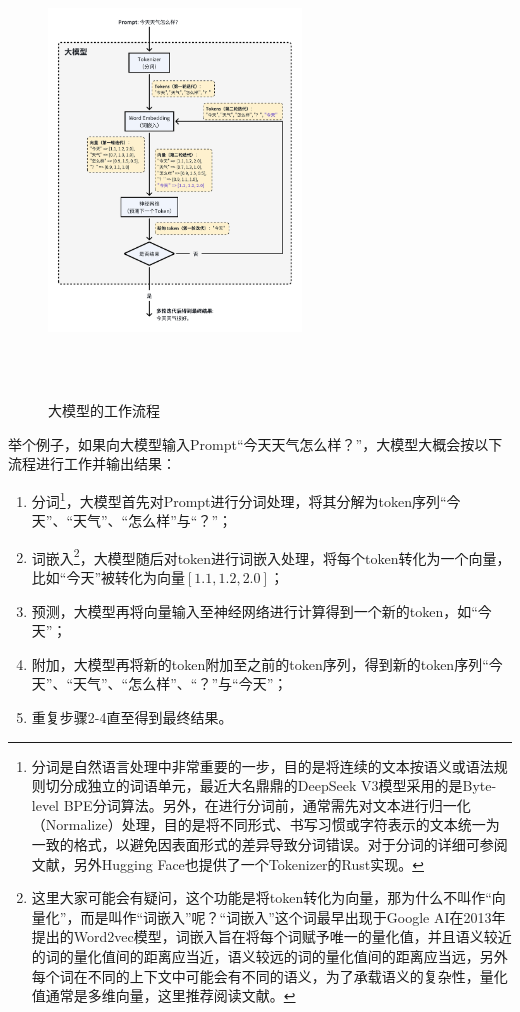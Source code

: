 \documentclass[letterpaper,11pt]{article}
\numberwithin{equation}{section}
\begin{document}
\begin{figure}[!htbp]
    \centering
    \includegraphics[width=0.6\textwidth, height=12cm, keepaspectratio]{../../assets/imgs/ai_share/llm_workflow.pdf}
    \caption{大模型的工作流程}
    \label{fig:llm-workflow}
\end{figure}

举个例子，如果向大模型输入Prompt“今天天气怎么样？”，大模型大概会按以下流程进行工作并输出结果：
\begin{enumerate}
    \item 分词\footnote{分词是自然语言处理中非常重要的一步，目的是将连续的文本按语义或语法规则切分成独立的词语单元，最近大名鼎鼎的DeepSeek V3模型采用的是Byte-level BPE分词算法。另外，在进行分词前，通常需先对文本进行归一化（Normalize）处理，目的是将不同形式、书写习惯或字符表示的文本统一为一致的格式，以避免因表面形式的差异导致分词错误。对于分词的详细可参阅文献\cite{glan2023tokenizer}，另外Hugging Face也提供了一个Tokenizer的Rust实现\cite{huggingface_tokenizers}。}，大模型首先对Prompt进行分词处理，将其分解为token序列“今天”、“天气”、“怎么样”与“？”；
    \item 词嵌入\footnote{这里大家可能会有疑问，这个功能是将token转化为向量，那为什么不叫作“向量化”，而是叫作“词嵌入”呢？“词嵌入”这个词最早出现于Google AI在2013年提出的Word2vec模型\cite{mikolov2013efficientestimationwordrepresentations}，词嵌入旨在将每个词赋予唯一的量化值，并且语义较近的词的量化值间的距离应当近，语义较远的词的量化值间的距离应当远，另外每个词在不同的上下文中可能会有不同的语义，为了承载语义的复杂性，量化值通常是多维向量，这里推荐阅读文献\cite{constantine2023wordembedding}。}，大模型随后对token进行词嵌入处理，将每个token转化为一个向量，比如“今天”被转化为向量$[1.1, 1.2, 2.0]$；
    \item 预测，大模型再将向量输入至神经网络进行计算得到一个新的token，如“今天”；
    \item 附加，大模型再将新的token附加至之前的token序列，得到新的token序列“今天”、“天气”、“怎么样”、“？”与“今天”；
    \item 重复步骤2-4直至得到最终结果。
\end{enumerate}

\printbibliography[title={引用}]
\end{document}
